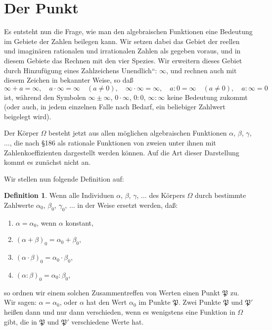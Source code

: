 \documentclass[12pt,a4paper]{article}
\theoremstyle{definition}
\newtheorem{defin}{Definition}[section]
\begin{document}
\section{Der Punkt}

Es entsteht nun die Frage, wie man den algebraischen Funktionen eine Bedeutung im Gebiete der Zahlen beilegen kann. Wir setzen dabei das Gebiet der reellen und imaginären rationalen und irrationalen Zahlen als gegeben voraus, und in diesem Gebiete das Rechnen mit den vier Spezies. Wir erweitern dieses Gebiet durch Hinzufügung eines Zahlzeichens \glqq Unendlich``: $\infty$, und rechnen auch mit diesem Zeichen in bekannter Weise, so daß
\begin{equation}
\infty + a = \infty, \quad a \cdot \infty = \infty \quad (a \neq 0), \quad \infty \cdot \infty = \infty, \quad a : 0 = \infty \quad (a \neq 0), \quad a : \infty = 0
\end{equation}
ist, während den Symbolen $\infty \pm \infty$, $0 \cdot \infty$, $0:0$, $\infty:\infty$ keine Bedeutung zukommt (oder auch, in jedem einzelnen Falle nach Bedarf, ein beliebiger Zahlwert beigelegt wird).

Der Körper $\Omega$ besteht jetzt aus allen möglichen algebraischen Funktionen $\alpha$, $\beta$, $\gamma$, $\ldots$, die nach \S 186 als rationale Funktionen von zweien unter ihnen mit Zahlenkoeffizienten dargestellt werden können. Auf die Art dieser Darstellung kommt es zunächst nicht an.

Wir stellen nun folgende Definition auf:

\begin{defin}
Wenn alle Individuen $\alpha$, $\beta$, $\gamma$, $\ldots$ des Körpers $\Omega$ durch bestimmte Zahlwerte $\alpha_0$, $\beta_0$, $\gamma_0$, $\ldots$ in der Weise ersetzt werden, daß:
\begin{enumerate}[label=\arabic*.]
\item $\alpha = \alpha_0$, wenn $\alpha$ konstant,
\item $(\alpha + \beta)_0 = \alpha_0 + \beta_0$,
\item $(\alpha \cdot \beta)_0 = \alpha_0 \cdot \beta_0$,
\item $(\alpha : \beta)_0 = \alpha_0 : \beta_0$,
\end{enumerate}
so ordnen wir einem solchen Zusammentreffen von Werten einen Punkt $\mathfrak{P}$ zu. Wir sagen: $\alpha = \alpha_0$, oder $\alpha$ hat den Wert $\alpha_0$ im Punkte $\mathfrak{P}$. Zwei Punkte $\mathfrak{P}$ und $\mathfrak{P}'$ heißen dann und nur dann verschieden, wenn es wenigstens eine Funktion in $\Omega$ gibt, die in $\mathfrak{P}$ und $\mathfrak{P}'$ verschiedene Werte hat.
\end{defin}
\end{document}
